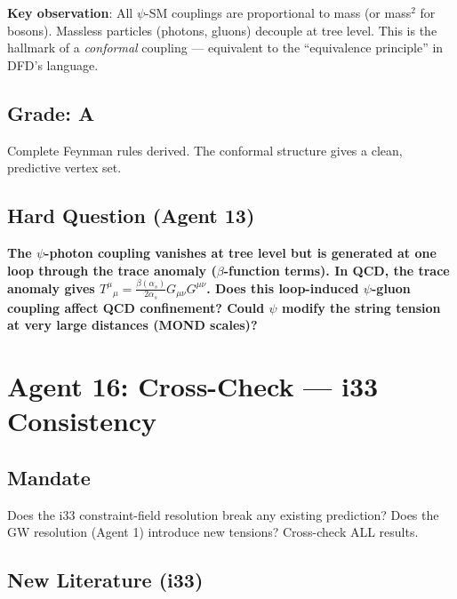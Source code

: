 \documentclass[11pt,a4paper]{article}
\begin{document}
\textbf{Key observation}: All $\psi$-SM couplings are proportional to mass (or mass$^2$ for bosons). Massless particles (photons, gluons) decouple at tree level. This is the hallmark of a \emph{conformal} coupling --- equivalent to the ``equivalence principle'' in DFD's language.

\subsection{Grade: A}

Complete Feynman rules derived. The conformal structure gives a clean, predictive vertex set.

\subsection{Hard Question (Agent 13)}

\textbf{The $\psi$-photon coupling vanishes at tree level but is generated at one loop through the trace anomaly ($\beta$-function terms). In QCD, the trace anomaly gives $T^\mu{}_\mu = \frac{\beta(\alpha_s)}{2\alpha_s}G_{\mu\nu}G^{\mu\nu}$. Does this loop-induced $\psi$-gluon coupling affect QCD confinement? Could $\psi$ modify the string tension at very large distances (MOND scales)?}

\newpage

\section{Agent 16: Cross-Check --- i33 Consistency}
\label{sec:agent16}

\subsection{Mandate}

Does the i33 constraint-field resolution break any existing prediction? Does the GW resolution (Agent 1) introduce new tensions? Cross-check ALL results.

\subsection{New Literature (i33)}
\end{document}
